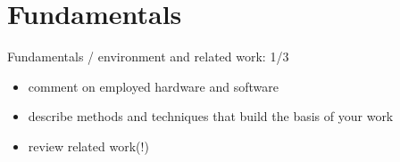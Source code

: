\chapter{Fundamentals}
\label{sec:fundamentals}

Fundamentals / environment and related work: 1/3

\begin{itemize}
\item comment on employed hardware and software
\item describe methods and techniques that build the basis of your work
\item review related work(!) 
\end{itemize}
